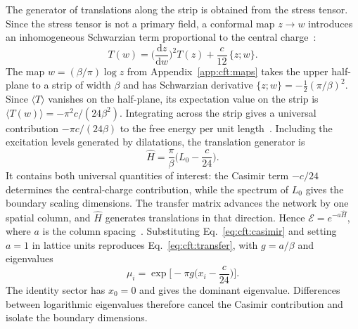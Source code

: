 The generator of translations along the strip is obtained from the stress tensor. Since the stress tensor is not a primary field, a conformal map $z\to w$ introduces an inhomogeneous Schwarzian term proportional to the central charge~\cite{difrancesco1997}:
\begin{equation}
  T(w) = \Big(\frac{\mathrm{d}z}{\mathrm{d}w}\Big)^{2} T(z) + \frac{c}{12}\,\{z;w\}.
  \label{eq:cft:schwarzian}
\end{equation}
The map $w=(\beta/\pi)\log z$ from Appendix~\ref{app:cft:maps} takes the upper half-plane to a strip of width $\beta$ and has Schwarzian derivative $\{z;w\}=-\tfrac12(\pi/\beta)^2$. Since $\langle T\rangle$ vanishes on the half-plane, its expectation value on the strip is $\langle T(w)\rangle=-\pi^2c/(24\beta^2)$. Integrating across the strip gives a universal contribution $-\pi c/(24\beta)$ to the free energy per unit length~\cite{blote_cardy_nightingale1986}. Including the excitation levels generated by dilatations, the translation generator is~\cite{cardy2004bcft}
\begin{equation}
  \hat H = \frac{\pi}{\beta}\Big(L_0 - \frac{c}{24}\Big).
  \label{eq:cft:casimir}
\end{equation}
It contains both universal quantities of interest: the Casimir term $-c/24$ determines the central-charge contribution, while the spectrum of $L_0$ gives the boundary scaling dimensions. The transfer matrix advances the network by one spatial column, and $\hat H$ generates translations in that direction. Hence $\mathcal{E}=e^{-a\hat H}$, where $a$ is the column spacing~\cite{carignano_tagliacozzo2025}. Substituting Eq.~\eqref{eq:cft:casimir} and setting $a=1$ in lattice units reproduces Eq.~\eqref{eq:cft:transfer}, with $g=a/\beta$ and eigenvalues
\begin{equation}
  \mu_i = \exp\!\Big[-\pi g\Big(x_i - \frac{c}{24}\Big)\Big].
  \label{eq:cft:mui}
\end{equation}
The identity sector has $x_0=0$ and gives the dominant eigenvalue. Differences between logarithmic eigenvalues therefore cancel the Casimir contribution and isolate the boundary dimensions.

